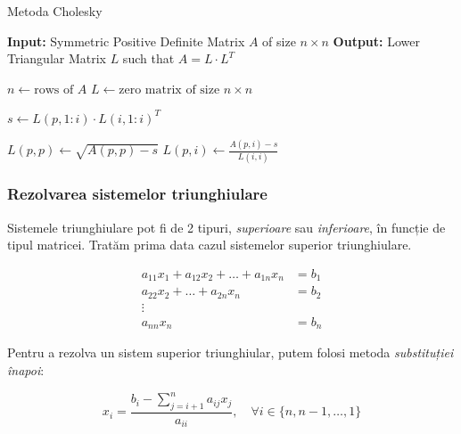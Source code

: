 \documentclass{exam}
\newcommand{\octavescript}[2]{
	
}
\begin{document}

\begin{algorithm}
	\caption{Metoda Cholesky}
	\begin{algorithmic}[1]
		\State \textbf{Input:} Symmetric Positive Definite Matrix \( A \) of size \( n \times n \)
		\State \textbf{Output:} Lower Triangular Matrix \( L \) such that \( A = L \cdot L^T \)

		\State \( n \gets \text{rows of } A \)
		\State \( L \gets \text{zero matrix of size } n \times n \)

		\State \( s \gets L(p, 1:i) \cdot L(i, 1:i)^T \)

		\State \( L(p, p) \gets \sqrt{A(p, p) - s} \)
		\Else
		\State \( L(p, i) \gets \frac{A(p, i) - s}{L(i, i)} \)
		\EndIf
		\EndFor
		\EndFor
	\end{algorithmic}
\end{algorithm}

\subsubsection{Rezolvarea sistemelor triunghiulare}

\par Sistemele triunghiulare pot fi de 2 tipuri, \textit{superioare} sau
\textit{inferioare}, în funcție de tipul matricei. Tratăm prima data cazul
sistemelor superior triunghiulare.

\begin{align*}
	a_{11} x_1 + a_{12} x_2 + \ldots + a_{1n} x_n & = b_1 \\
	a_{22} x_2 + \ldots + a_{2n} x_n              & = b_2 \\
	\vdots                                                \\
	a_{nn} x_n                                    & = b_n
\end{align*}

\par Pentru a rezolva un sistem superior triunghiular, putem folosi metoda
\textit{substituției înapoi}:

\begin{equation}
	x_i = \frac{b_i - \sum_{j = i + 1}^{n}{a_{ij} x_j}}{a_{ii}}, \quad \forall i \in \{n, n - 1, \ldots, 1\}
\end{equation}

\end{document}
